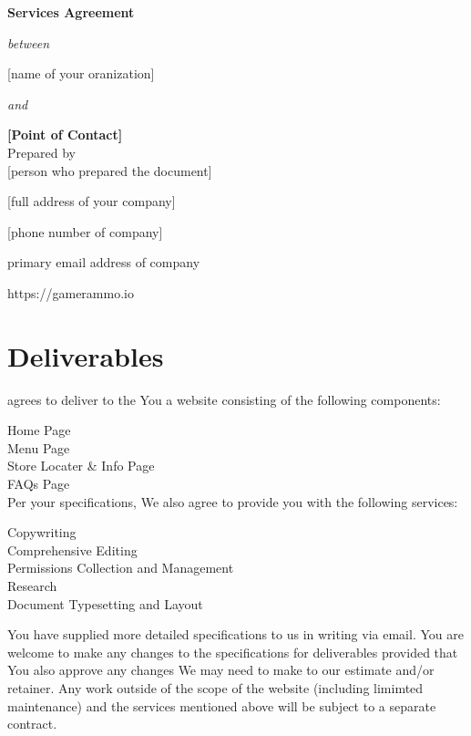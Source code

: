 \documentclass[usletter,11pt]{article} %
\renewcommand{\companyname}{[name of your oranization]} %
\renewcommand{\preparer}{[person who prepared the document]} %
\renewcommand{\companyaddress}{[full address of your company]}
\renewcommand{\companyphone}{[phone number of company]}
\renewcommand{\companyemail}{primary email address of company}
\renewcommand{\clientname}{[Point of Contact]}  %
\begin{document}
\vspace*{\fill} %

\begin{center}

{\huge \textbf{Services Agreement}}

\small\textit{{between}}

{\Large \companyname}

\small\textit{{and}}

{\LARGE\textbf{\clientname}}\\

\vspace{5ex}
Prepared by\\
\vspace{2ex}
\preparer
\vspace{2ex}

\companyaddress

\companyphone

\companyemail

https://gamerammo.io

\end{center}

\vspace*{\fill} %

\newpage

{\deliverables}{
\section{Deliverables}

\ludu agrees to deliver to the You a website consisting of the following components:

Home Page\\
Menu Page\\
Store Locater \& Info Page\\
FAQs Page\\

Per your specifications, We also agree to provide you with the following services:

Copywriting\\
Comprehensive Editing\\
Permissions Collection and Management\\
Research\\
\latex Document Typesetting and Layout

You have supplied more detailed specifications to us in writing via email. You are welcome to make any changes to the specifications for deliverables provided that You also approve any changes We may need to make to our estimate and/or retainer. Any work outside of the scope of the website (including limimted maintenance) and the services mentioned above will be subject to a separate contract.
}
\end{document}
